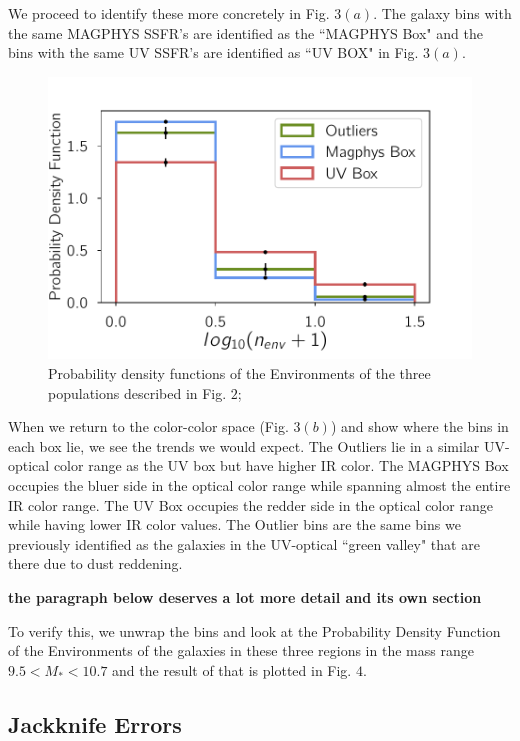 \documentclass[iop]{emulateapj}
\begin{document}
We proceed to identify these more concretely in 
Fig. $3(a)$. The galaxy bins with the same MAGPHYS 
SSFR's are identified as the ``MAGPHYS Box" and 
the bins with the same UV SSFR's are identified as 
``UV BOX" in Fig. $3(a)$. \\

\begin{figure}
	\centering
		\includegraphics[width = 9 cm, height = 6.0 cm]{4_jk_plot.pdf}
	\caption{Probability density functions of the Environments of the three populations described in Fig. $2$; } 
\end{figure}

When we return to the color-color space (Fig. $3(b)$) and show
where the bins in each box lie,  we see the trends we would expect. 
The Outliers  lie in a similar UV-optical color range as the UV box 
but have higher IR color. The MAGPHYS Box occupies the bluer side 
in the optical color range while spanning almost the entire IR color range. 
The UV Box occupies the redder side in the optical color range while 
having lower IR color values. The Outlier bins are the 
same bins we previously identified as the galaxies in 
the UV-optical ``green valley" that are there due to dust reddening. 

\textbf{the paragraph below deserves a lot more detail and its own section}

To verify this, we unwrap the bins and look at the Probability 
Density Function of the Environments of the galaxies in these three regions in the mass range  $ 9.5 < M_{*} < 10.7$ and the result of that is plotted in Fig. $4$.

\subsection{Jackknife Errors}
\end{document}
